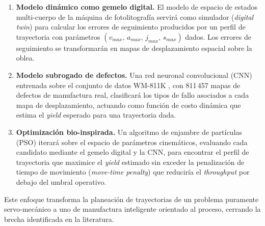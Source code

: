 \documentclass[11pt]{article}
\theoremstyle{definition}
\begin{document}
\begin{enumerate}[leftmargin=1.5em, label=\textbf{\arabic*.}]

\item \textbf{Modelo dinámico como gemelo digital.} El modelo de espacio de estados multi-cuerpo de la máquina de fotolitografía \supercite{Al-Rawashdeh2022_Caracterization} servirá como simulador (\textit{digital twin}) para calcular los errores de seguimiento producidos por un perfil de trayectoria con parámetros $(v_{max},\, a_{max},\, j_{max},\, s_{max})$ dados. Los errores de seguimiento se transformarán en mapas de desplazamiento espacial sobre la oblea.

\item \textbf{Modelo subrogado de defectos.} Una red neuronal convolucional (CNN) entrenada sobre el conjunto de datos WM-811K \supercite{Wu2015_WM811K}, con 811\,457 mapas de defectos de manufactura real, clasificará los tipos de fallo asociados a cada mapa de desplazamiento, actuando como función de costo dinámica que estima el \textit{yield} esperado para una trayectoria dada.

\item \textbf{Optimización bio-inspirada.} Un algoritmo de enjambre de partículas (PSO) iterará sobre el espacio de parámetros cinemáticos, evaluando cada candidato mediante el gemelo digital y la CNN, para encontrar el perfil de trayectoria que maximice el \textit{yield} estimado sin exceder la penalización de tiempo de movimiento (\textit{move-time penalty}) que reduciría el \textit{throughput} por debajo del umbral operativo.

\end{enumerate}

\noindent Este enfoque transforma la planeación de trayectorias de un problema puramente servo-mecánico a uno de manufactura inteligente orientado al proceso, cerrando la brecha identificada en la literatura.

\printbibliography
\end{document}
